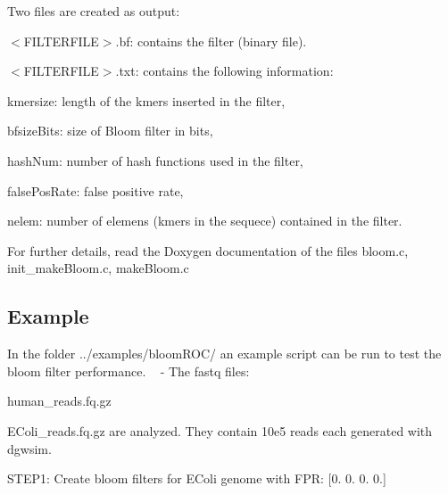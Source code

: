 Two files are created as output\+:
\begin{DoxyItemize}
\item {\ttfamily $<$F\+I\+L\+T\+E\+R\+F\+I\+LE$>$.bf}\+: contains the filter (binary file).
\item {\ttfamily $<$F\+I\+L\+T\+E\+R\+F\+I\+LE$>$.txt}\+: contains the following information\+:
\begin{DoxyItemize}
\item {\ttfamily kmersize}\+: length of the kmers inserted in the filter,
\item {\ttfamily bfsize\+Bits}\+: size of Bloom filter in bits,
\item {\ttfamily hash\+Num}\+: number of hash functions used in the filter,
\item {\ttfamily false\+Pos\+Rate\+:} false positive rate,
\item {\ttfamily nelem}\+: number of elemens (kmers in the sequece) contained in the filter.
\end{DoxyItemize}
\end{DoxyItemize}

For further details, read the {\ttfamily Doxygen} documentation of the files {\ttfamily bloom.\+c}, {\ttfamily init\+\_\+make\+Bloom.\+c}, {\ttfamily make\+Bloom.\+c}

\subsection*{Example}

In the folder {\ttfamily ../examples/bloom\+R\+O\+C/} an example script can be run to test the bloom filter performance. ~\newline
 -\/ The fastq files\+:
\begin{DoxyItemize}
\item {\ttfamily human\+\_\+reads.\+fq.\+gz}
\item {\ttfamily E\+Coli\+\_\+reads.\+fq.\+gz} are analyzed. They contain 10e5 reads each generated with {\ttfamily dgwsim}.
\end{DoxyItemize}

S\+T\+E\+P1\+: Create bloom filters for E\+Coli genome with F\+PR\+: {\ttfamily \mbox{[}0. 0. 0. 0.\mbox{]}} ~\newline

